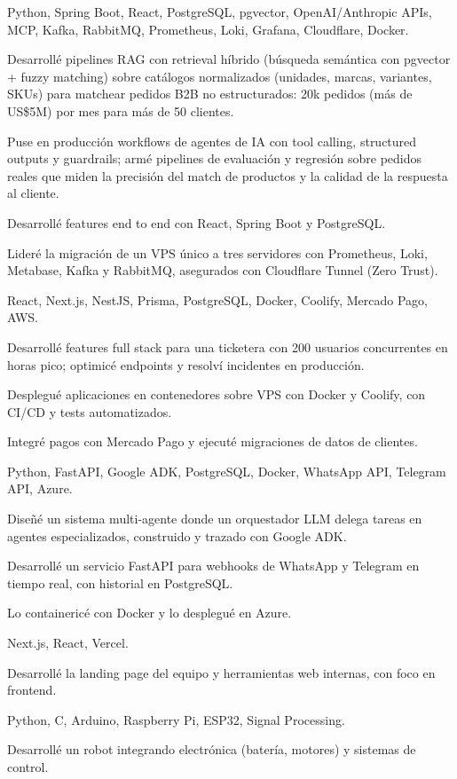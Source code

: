 \documentclass[10pt]{article}
\begin{document}
      {Python, Spring Boot, React, PostgreSQL, pgvector, OpenAI/Anthropic APIs, MCP, Kafka, RabbitMQ, Prometheus, Loki, Grafana, Cloudflare, Docker.}{
      \item Desarrollé pipelines RAG con retrieval híbrido (búsqueda semántica con pgvector + fuzzy matching) sobre catálogos normalizados (unidades, marcas, variantes, SKUs) para matchear pedidos B2B no estructurados: 20k pedidos (más de US\$5M) por mes para más de 50 clientes.
      \item Puse en producción workflows de agentes de IA con tool calling, structured outputs y guardrails; armé pipelines de evaluación y regresión sobre pedidos reales que miden la precisión del match de productos y la calidad de la respuesta al cliente.
      \item Desarrollé features end to end con React, Spring Boot y PostgreSQL.
      \item Lideré la migración de un VPS único a tres servidores con Prometheus, Loki, Metabase, Kafka y RabbitMQ, asegurados con Cloudflare Tunnel (Zero Trust).
    }
      {React, Next.js, NestJS, Prisma, PostgreSQL, Docker, Coolify, Mercado Pago, AWS.}{
      \item Desarrollé features full stack para una ticketera con 200 usuarios concurrentes en horas pico; optimicé endpoints y resolví incidentes en producción.
      \item Desplegué aplicaciones en contenedores sobre VPS con Docker y Coolify, con CI/CD y tests automatizados.
      \item Integré pagos con Mercado Pago y ejecuté migraciones de datos de clientes.
    }
      {Python, FastAPI, Google ADK, PostgreSQL, Docker, WhatsApp API, Telegram API, Azure.}{
      \item Diseñé un sistema multi-agente donde un orquestador LLM delega tareas en agentes especializados, construido y trazado con Google ADK.
      \item Desarrollé un servicio FastAPI para webhooks de WhatsApp y Telegram en tiempo real, con historial en PostgreSQL.
      \item Lo containericé con Docker y lo desplegué en Azure.
    }
      {Next.js, React, Vercel.}{
      \item Desarrollé la landing page del equipo y herramientas web internas, con foco en frontend.
    }
      {Python, C, Arduino, Raspberry Pi, ESP32, Signal Processing.}{
      \item Desarrollé un robot integrando electrónica (batería, motores) y sistemas de control.
    }
\end{document}
